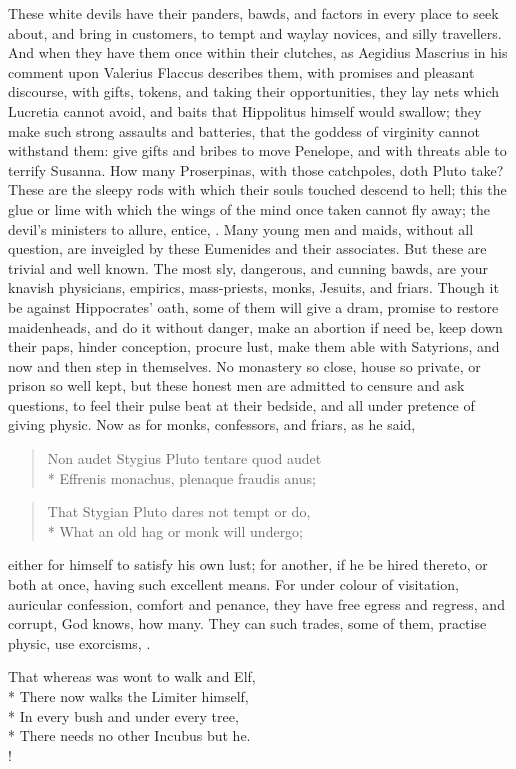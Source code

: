 These white devils have their panders, bawds, and factors in every
place to seek about, and bring in customers, to tempt and waylay
novices, and silly travellers. And when they have them once within
their clutches, as Aegidius Mascrius in his comment upon Valerius
Flaccus describes them, with promises and pleasant discourse,
with gifts, tokens, and taking their opportunities, they lay nets which
Lucretia cannot avoid, and baits that Hippolitus himself would swallow;
they make such strong assaults and batteries, that the goddess of
virginity cannot withstand them: give gifts and bribes to move
Penelope, and with threats able to terrify Susanna. How many
Proserpinas, with those catchpoles, doth Pluto take? These are the
sleepy rods with which their souls touched descend to hell; this the
glue or lime with which the wings of the mind once taken cannot fly
away; the devil's ministers to allure, entice, \etc{}. Many young men and
maids, without all question, are inveigled by these Eumenides and their
associates. But these are trivial and well known. The most sly,
dangerous, and cunning bawds, are your knavish physicians, empirics,
mass-priests, monks, Jesuits, and friars. Though it be against
Hippocrates' oath, some of them will give a dram, promise to restore
maidenheads, and do it without danger, make an abortion if need be,
keep down their paps, hinder conception, procure lust, make them able
with Satyrions, and now and then step in themselves. No monastery so
close, house so private, or prison so well kept, but these honest men
are admitted to censure and ask questions, to feel their pulse beat at
their bedside, and all under pretence of giving physic. Now as for
monks, confessors, and friars, as he said,
%
\begin{latin}
\begin{verse}
Non audet Stygius Pluto tentare quod audet\\*
Effrenis monachus, plenaque fraudis anus;
\end{verse}
\end{latin}
\translationrule
\begin{verse}
That Stygian Pluto dares not tempt or do,\\*
What an old hag or monk will undergo;
\end{verse}

either for himself to satisfy his own lust; for another, if he be hired
thereto, or both at once, having such excellent means. For under colour
of visitation, auricular confession, comfort and penance, they have
free egress and regress, and corrupt, God knows, how many. They can
such trades, some of them, practise physic, use exorcisms, \etc{}.
%
{\gothfont%
\begin{versewithlinenos}{2}{1}{1}%
That whereas was wont to walk and Elf,\\*
There now walks the Limiter himself,\\*
In every bush and under every tree,\\*
There needs no other Incubus but he.\\!
\end{versewithlinenos}%
}%


